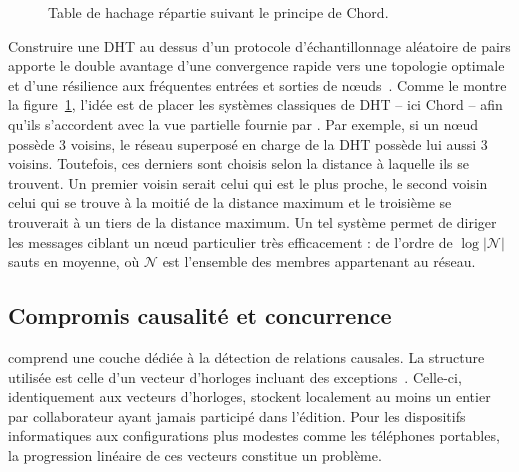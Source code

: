 \begin{figure}
  \begin{center}
    
    \caption[Table de hachage répartie]
    {\label{conclu:fig:dhtexample}Table de hachage répartie suivant le principe
      de Chord.}
  \end{center}
\end{figure}

Construire une DHT au dessus d'un protocole d'échantillonnage aléatoire de pairs
apporte le double avantage d'une convergence rapide vers une topologie optimale
et d'une résilience aux fréquentes entrées et sorties de
nœuds~\cite{krasikova2016distributed, montresor2005chord,
  voulgaris2013vicinity}.  Comme le montre la
figure~\ref{conclu:fig:dhtexample}, l'idée est de placer les systèmes classiques
de DHT -- ici Chord -- afin qu'ils s'accordent avec la vue partielle fournie par
\SPRAY. Par exemple, si un nœud \SPRAY possède 3 voisins, le réseau superposé en
charge de la DHT possède lui aussi 3 voisins. Toutefois, ces derniers sont
choisis selon la distance à laquelle ils se trouvent. Un premier voisin serait
celui qui est le plus proche, le second voisin celui qui se trouve à la moitié
de la distance maximum et le troisième se trouverait à un tiers de la distance
maximum. Un tel système permet de diriger les messages ciblant un nœud
particulier très efficacement : de l'ordre de $\log |\mathcal{N}|$ sauts en
moyenne, où $\mathcal{N}$ est l'ensemble des membres appartenant au réseau.



\subsection{Compromis causalité et concurrence}

\CRATE comprend une couche dédiée à la détection de relations causales. La
structure utilisée est celle d'un vecteur d'horloges incluant des
exceptions~\cite{malkhi2007concise}. Celle-ci, identiquement aux vecteurs
d'horloges, stockent localement au moins un entier par collaborateur ayant
jamais participé dans l'édition. Pour les dispositifs informatiques aux
configurations plus modestes comme les téléphones portables, la progression
linéaire de ces vecteurs constitue un problème.


